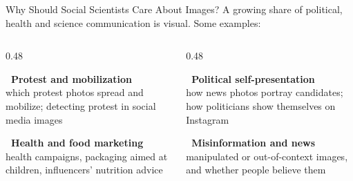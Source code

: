 \newcommand{\coursemodule}{Module 01}





\begin{frame}{Why Should Social Scientists Care About Images?}
A growing share of political, health and science communication is visual. Some examples:

\vspace{0.1cm}
\begin{columns}[T]
\begin{column}{0.48\textwidth}
\begin{greenbox}
\textbf{\faBullhorn\ Protest and mobilization}\\
which protest photos spread and mobilize; detecting protest in social media images
\end{greenbox}
\begin{greenbox}
\textbf{\faUtensils\ Health and food marketing}\\
health campaigns, packaging aimed at children, influencers' nutrition advice
\end{greenbox}
\end{column}
\begin{column}{0.48\textwidth}
\begin{greenbox}
\textbf{\faUserTie\ Political self-presentation}\\
how news photos portray candidates; how politicians show themselves on Instagram
\end{greenbox}
\begin{greenbox}
\textbf{\faNewspaper\ Misinformation and news}\\
manipulated or out-of-context images, and whether people believe them
\end{greenbox}
\end{column}
\end{columns}

\vspace{0.05cm}
\end{frame}

